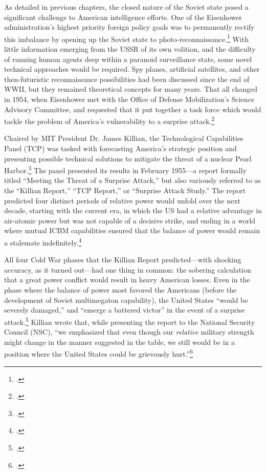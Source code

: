 \documentclass{memoir}
\begin{document}
As detailed in previous chapters, the closed nature of the Soviet state posed a significant challenge to American intelligence efforts. One of the Eisenhower administration's highest priority foreign policy goals was to permanently rectify this imbalance by opening up the Soviet state to photo-reconnaissance.\footcite[p.~65]{hayes_struggling_1994} With little information emerging from the USSR of its own volition, and the difficulty of running human agents deep within a paranoid surveillance state, some novel technical approaches would be required. Spy planes, artificial satellites, and other then-futuristic reconnaissance possibilities had been discussed since the end of WWII, but they remained theoretical concepts for many years. That all changed in 1954, when Eisenhower met with the Office of Defense Mobilization's Science Advisory Committee, and requested that it put together a task force which would tackle the problem of America's vulnerability to a surprise attack.\footcite[p.~67. The president's science advisor described this moment as the starting point for ``any complete account of how science advice was mobilized for the use of President Eisenhower.'']{killian_sputnik_1977}

Chaired by MIT President Dr. James Killian, the Technological Capabilities Panel (TCP) was tasked with forecasting America's strategic position and presenting possible technical solutions to mitigate the threat of a nuclear Pearl Harbor.\footcite[p.~115]{mcdougall_heavens_1985} The panel presented its results in February 1955---a report formally titled ``Meeting the Threat of a Surprise Attack,'' but also variously referred to as the ``Killian Report,'' ``TCP Report,'' or ``Surprise Attack Study.'' The report predicted four distinct periods of relative power would unfold over the next decade, starting with the current era, in which the US had a relative advantage in air-atomic power but was not capable of a decisive strike, and ending in a world where mutual ICBM capabilities ensured that the balance of power would remain a stalemate indefinitely.\footcite[p.~116]{mcdougall_heavens_1985}

All four Cold War phases that the Killian Report predicted---with shocking accuracy, as it turned out---had one thing in common: the sobering calculation that a great power conflict would result in heavy American losses. Even in the phase where the balance of power most favored the Americans (before the development of Soviet multimegaton capability), the United States ``would be severely damaged,'' and ``emerge a battered victor'' in the event of a surprise attack.\footcite{technological_capabilities_panel_meeting_1955} Killian wrote that, while presenting the report to the National Security Council (NSC), ``we emphasized that even though our \emph{relative} military strength might change in the manner suggested in the table, we still would be in a position where the United States could be grievously hurt.''\footcite[p.~75]{killian_sputnik_1977}
\end{document}
